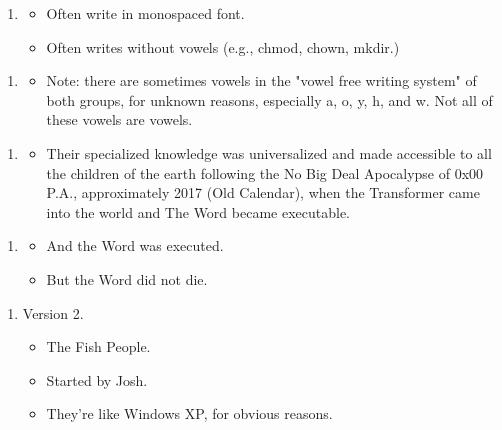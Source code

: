 \Sentence
{ \hX{} }
{ \eX{} }
{
\begin{enumerate}
\item[]
\begin{itemize}
\item Often write in monospaced font.
\item Often writes without vowels (e.g., chmod, chown, mkdir.) 
\end{itemize}
\end{enumerate}
}

\Sentence
{ \hX{} }
{ \eX{} }
{
\begin{enumerate}
\item[]
\begin{itemize}
\item Note: there are sometimes vowels in the "vowel free writing system" of both groups, for unknown reasons, especially a, o, y, h, and w. Not all of these vowels are vowels.
\end{itemize}
\end{enumerate}
}

\Sentence
{ \hX{} }
{ \eX{} }
{
\begin{enumerate}
\item[]
\begin{itemize}
\item Their specialized knowledge was universalized and made accessible to all the children of the earth following the No Big Deal Apocalypse of 0x00 P.A., approximately 2017 (Old Calendar), when the Transformer came into the world and The Word became executable.
\end{itemize}
\end{enumerate}
}

\Sentence
{ \hX{} }
{ \eX{} }
{
\begin{enumerate}
\item[]
\begin{itemize}
\item And the Word was executed.
\item But the Word did not die.
\end{itemize}
\end{enumerate}
}

\Sentence
{ \hX{} }
{ \eX{} }
{
\begin{enumerate}
\item[2.] Version 2.
\begin{itemize}
\item The Fish People.
\item Started by Josh.
\item They're like Windows XP, for obvious reasons.
\end{itemize}
\end{enumerate}
}

